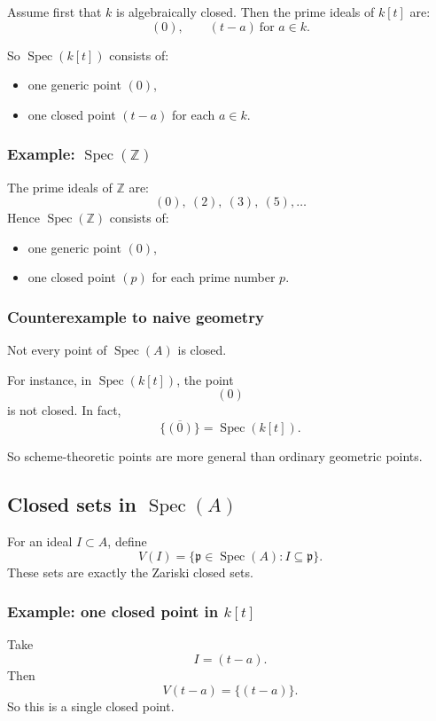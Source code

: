 \documentclass[12pt,a4paper]{article}
\theoremstyle{notespace}
\newcommand{\Spec}{\operatorname{Spec}}
\newcommand{\mf}{\mathfrak}
\theoremstyle{definition}
\begin{document}
Assume first that \(k\) is algebraically closed. Then the prime ideals of \(k[t]\) are:
\[
(0),\qquad (t-a)\ \text{for } a\in k.
\]

So \(\Spec(k[t])\) consists of:
\begin{itemize}
	\item one generic point \((0)\),
	\item one closed point \((t-a)\) for each \(a\in k\).
\end{itemize}

\subsubsection{Example: \(\Spec(\mathbb Z)\)}

The prime ideals of \(\mathbb Z\) are:
\[
(0),\ (2),\ (3),\ (5),\dots
\]
Hence \(\Spec(\mathbb Z)\) consists of:
\begin{itemize}
	\item one generic point \((0)\),
	\item one closed point \((p)\) for each prime number \(p\).
\end{itemize}

\subsubsection{Counterexample to naive geometry}

Not every point of \(\Spec(A)\) is closed.

For instance, in \(\Spec(k[t])\), the point
\[
(0)
\]
is not closed. In fact,
\[
\overline{\{(0)\}}=\Spec(k[t]).
\]

So scheme-theoretic points are more general than ordinary geometric points.

\subsection{Closed sets in \(\Spec(A)\)}

For an ideal \(I\subset A\), define
\[
V(I)=\{\mf p\in \Spec(A): I\subseteq \mf p\}.
\]
These sets are exactly the Zariski closed sets.

\subsubsection{Example: one closed point in \(k[t]\)}

Take
\[
I=(t-a).
\]
Then
\[
V(t-a)=\{(t-a)\}.
\]
So this is a single closed point.
\end{document}
